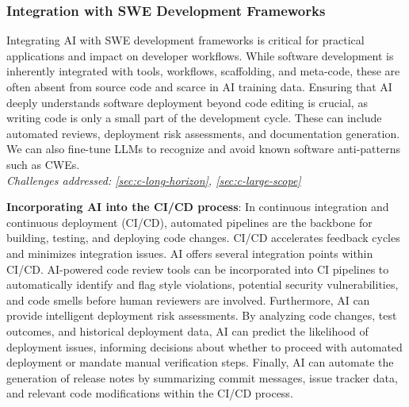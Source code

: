 
\subsubsection{Integration with SWE Development Frameworks} \label{sec:d-swe-integration}

\begin{tcolorbox}[colback=lightorange, boxrule=0pt, arc=5pt, outer arc=5pt]
Integrating AI with SWE development frameworks is critical for practical applications and impact on developer workflows. While software development is inherently integrated with tools, workflows, scaffolding, and meta-code, these are often absent from source code and scarce in AI training data. Ensuring that AI deeply understands software deployment beyond code editing is crucial, as writing code is only a small part of the development cycle. These can include automated reviews, deployment risk assessments, and documentation generation. We can also fine-tune LLMs to recognize and avoid known software anti-patterns such as CWEs. 
\newline \\
\textit{Challenges addressed: \ref{sec:c-long-horizon}, \ref{sec:c-large-scope}}
\end{tcolorbox}

\textbf{Incorporating AI into the CI/CD process}: In continuous integration and continuous deployment (CI/CD), automated pipelines are the backbone for building, testing, and deploying code changes. CI/CD accelerates feedback cycles and minimizes integration issues. AI offers several integration points within CI/CD. AI-powered code review tools can be incorporated into CI pipelines to automatically identify and flag style violations, potential security vulnerabilities, and code smells before human reviewers are involved. Furthermore, AI can provide intelligent deployment risk assessments. By analyzing code changes, test outcomes, and historical deployment data, AI can predict the likelihood of deployment issues, informing decisions about whether to proceed with automated deployment or mandate manual verification steps. Finally, AI can automate the generation of release notes by summarizing commit messages, issue tracker data, and relevant code modifications within the CI/CD process.

